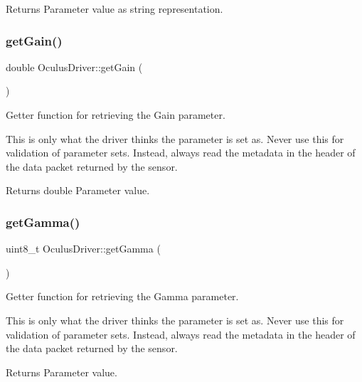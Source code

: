 \begin{DoxyReturn}{Returns}
Parameter value as string representation. 
\end{DoxyReturn}
\mbox{\label{classOculusDriver_a38aff7fbcd3629ae98a534fb3d08fcb3}} 
\subsubsection{\texorpdfstring{get\+Gain()}{getGain()}}
{\footnotesize\ttfamily double Oculus\+Driver\+::get\+Gain (\begin{DoxyParamCaption}{ }\end{DoxyParamCaption})}

Getter function for retrieving the Gain parameter.

This is only what the driver thinks the parameter is set as. Never use this for validation of parameter sets. Instead, always read the metadata in the header of the data packet returned by the sensor.

\begin{DoxyReturn}{Returns}
{\ttfamily  double  Parameter value. }
\end{DoxyReturn}
\mbox{\label{classOculusDriver_a82843006c51f2f444f0c945ff48f23f5}} 
\subsubsection{\texorpdfstring{get\+Gamma()}{getGamma()}}
{\footnotesize\ttfamily uint8\+\_\+t Oculus\+Driver\+::get\+Gamma (\begin{DoxyParamCaption}{ }\end{DoxyParamCaption})}

Getter function for retrieving the Gamma parameter.

This is only what the driver thinks the parameter is set as. Never use this for validation of parameter sets. Instead, always read the metadata in the header of the data packet returned by the sensor.

\begin{DoxyReturn}{Returns}
Parameter value. 
\end{DoxyReturn}
\mbox{\label{classOculusDriver_ad2c11be70c8769b5a2e1701fece192f5}} 
